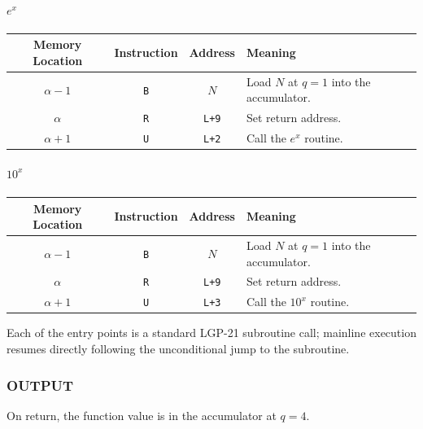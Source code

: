 \paragraph{$e^x$}
\begin{center}
\begin{tabularx}{\textwidth}{cccX}
\toprule
\textbf{Memory Location} & \textbf{Instruction} & \textbf{Address} & \textbf{Meaning} \\
\midrule
$\alpha-1$ & \texttt{B} & $N$ & Load $N$ at $q=1$ into the accumulator. \\
$\alpha$ & \texttt{R} & \texttt{L+9} & Set return address. \\
$\alpha+1$ & \texttt{U} & \texttt{L+2} & Call the $e^x$ routine. \\
\bottomrule
\end{tabularx}
\end{center}

\paragraph{$10^x$}
\begin{center}
\begin{tabularx}{\textwidth}{cccX}
\toprule
\textbf{Memory Location} & \textbf{Instruction} & \textbf{Address} & \textbf{Meaning} \\
\midrule
$\alpha-1$ & \texttt{B} & $N$ & Load $N$ at $q=1$ into the accumulator. \\
$\alpha$ & \texttt{R} & \texttt{L+9} & Set return address. \\
$\alpha+1$ & \texttt{U} & \texttt{L+3} & Call the $10^x$ routine. \\
\bottomrule
\end{tabularx}
\end{center}
Each of the entry points is a standard LGP-21 subroutine call; mainline execution resumes directly following the unconditional jump to the subroutine.

\subsubsection*{OUTPUT}
On return, the function value is in the accumulator at $q=4$.

